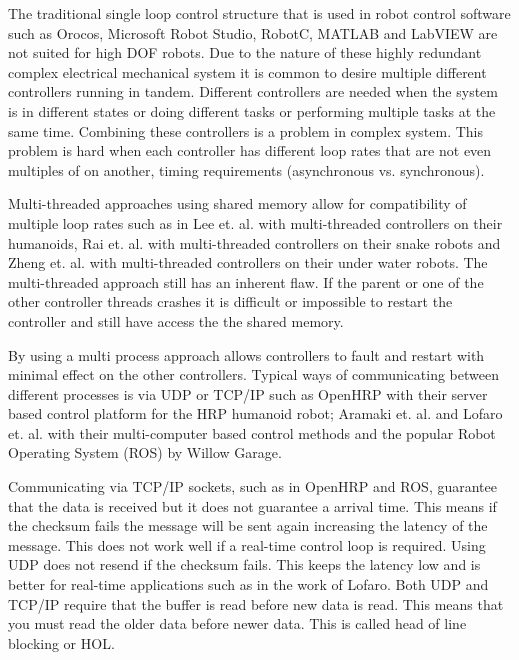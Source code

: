 The traditional single loop control structure that is used in robot control software such as Orocos\cite{orocos-gadeyne-ijrr2005}, Microsoft Robot Studio\cite{microsoftRobot4437755}, RobotC\cite{robotc}, MATLAB\cite{matlab} and LabVIEW\cite{labview} are not suited for high DOF robots.
Due to the nature of these highly redundant complex electrical mechanical system it is common to desire multiple different controllers running in tandem.  
Different controllers are needed when the system is in different states or doing different tasks or performing multiple tasks at the same time.
Combining these controllers is a problem in complex system.
This problem is hard when each controller has different loop rates that are not even multiples of on another, timing requirements (asynchronous vs. synchronous).

Multi-threaded approaches using shared memory allow for compatibility of multiple loop rates such as in Lee et. al.\cite{multi-thread-robot-5602743} with multi-threaded controllers on their humanoids, Rai et. al.\cite{multi-thread-snake-1541141} with multi-threaded controllers on their snake robots and Zheng et. al.\cite{multi-thread-5524083} with multi-threaded controllers on their under water robots.
The multi-threaded approach still has an inherent flaw.
If the parent or one of the other controller threads crashes it is difficult or impossible to restart the controller and still have access the the shared memory.

By using a multi process approach allows controllers to fault and restart with minimal effect on the other controllers.
Typical ways of communicating between different processes is via UDP or TCP/IP such as OpenHRP\cite{openHRP} with their server based control platform for the HRP humanoid robot; Aramaki et. al.\cite{multiPC-arch-1185243} and Lofaro et. al.\cite{lofaroIASTED2011} with their multi-computer based control methods and the popular Robot Operating System (ROS)\cite{ros} by Willow Garage.

Communicating via TCP/IP sockets, such as in OpenHRP and ROS, guarantee that the data is received but it does not guarantee a arrival time.
This means if the checksum fails the message will be sent again increasing the latency of the message.
This does not work well if a real-time control loop is required.
Using UDP does not resend if the checksum fails.
This keeps the latency low and is better for real-time applications such as in the work of Lofaro.
Both UDP and TCP/IP require that the buffer is read before new data is read.
This means that you must read the older data before newer data.
This is called head of line blocking or HOL\cite{ach}.

